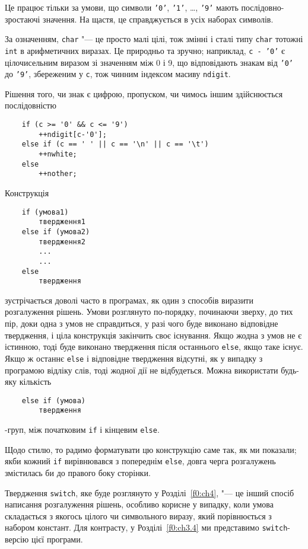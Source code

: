 \documentclass[a4paper,12pt]{book}
\begin{document}
  Це працює тільки за умови, що символи \texttt{'0'}, \texttt{'1'}, \ldots, \texttt{'9'}
  мають послідовно-зростаючі значення. На щастя, це справджується в усіх наборах символів.

  За означенням, \texttt{char} "--- це просто малі цілі, тож змінні і сталі типу
  \texttt{char} тотожні \texttt{int} в арифметичних виразах. Це природньо та зручно;
  наприклад, \texttt{c - '0'} є цілочисельним виразом зі значенням між 0 і 9, що
  відповідають знакам від \texttt{'0'} до \texttt{'9'}, збереженим у \texttt{c}, тож
  чинним індексом масиву \texttt{ndigit}.

  Рішення того, чи знак є цифрою, пропуском, чи чимось іншим здійснюється послідовністю
  \begin{verbatim}
    if (c >= '0' && c <= '9')
        ++ndigit[c-'0'];
    else if (c == ' ' || c == '\n' || c == '\t')
        ++nwhite;
    else
        ++nother;
  \end{verbatim}

  Конструкція
  \begin{verbatim}
    if (умова1)
        твердження1
    else if (умова2)
        твердження2
        ...
        ...
    else
        твердження
  \end{verbatim}
  зустрічається доволі часто в програмах, як один з способів виразити розгалуження рішень.
  Умови розглянуто по-порядку, починаючи зверху, до тих пір, доки одна з умов не
  справдиться, у разі чого буде виконано відповідне твердження, і ціла конструкція
  закінчить своє існування. Якщо жодна з умов не є істинною, тоді буде виконано твердження
  після останнього \texttt{else}, якщо таке існує. Якщо ж останнє \texttt{else} і
  відповідне твердження відсутні, як у випадку з програмою відліку слів, тоді жодної дії
  не відбудеться. Можна використати будь-яку кількість
  \begin{verbatim}
    else if (умова)
        твердження
  \end{verbatim}
  -груп, між початковим \texttt{if} і кінцевим \texttt{else}.

  Щодо стилю, то радимо форматувати цю конструкцію саме так, як ми показали; якби кожний
  \texttt{if} вирівнювався з попереднім \texttt{else}, довга черга розгалужень змістилась
  би до правого боку сторінки.

  Твердження \texttt{switch}, яке буде розглянуто у Розділі~\ref{f0:ch4}, "--- це
  інший спосіб написання розгалуження рішень, особливо корисне у випадку, коли умова
  складається з якогось цілого чи символьного виразу, який порівнюється з набором
  констант. Для контрасту, у Розділі~\ref{f0:ch3.4} ми представимо
  \texttt{switch}-версію цієї програми.
\end{document}
